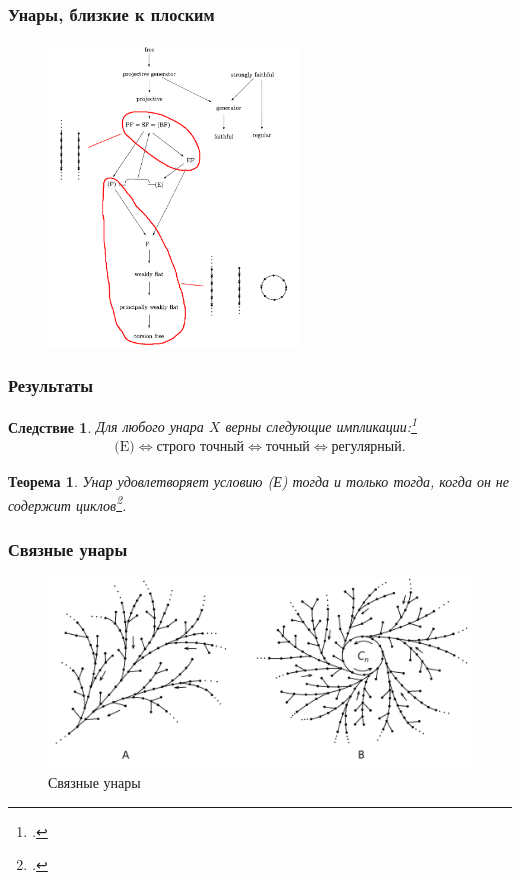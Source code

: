 \documentclass[11pt, notheorems]{beamer}
\newtheorem{theorem}{Теорема}
\newtheorem{corollary}{Следствие}
\begin{document}
\begin{frame}
	\frametitle{Унары, близкие к плоским}

	\begin{figure}
		\center
		\includegraphics[width=0.6\textwidth]{overview_4.png}
	\end{figure}
\end{frame}

\begin{frame}
	\frametitle{Результаты}

	\begin{corollary}
		Для любого унара $X$ верны следующие импликации:\footcite[следствие 4]{pryan:unars_close_to_flat}
		\begin{gather*}
			\text{(E)} \Leftrightarrow \text{строго точный} \Leftrightarrow \text{точный} \Leftrightarrow \text{регулярный.}
		\end{gather*}
	\end{corollary}

	\begin{theorem}
		Унар удовлетворяет условию (Е) тогда и только тогда, когда он не содержит циклов\footcite[теорема 4]{pryan:unars_close_to_flat}.
	\end{theorem}
\end{frame}

\begin{frame}
	\frametitle{Связные унары}

	\begin{figure}
		\center
		\includegraphics[width=1.0\textwidth]{connected_unars}
		\caption{Связные унары}
	\end{figure}
\end{frame}
\end{document}
